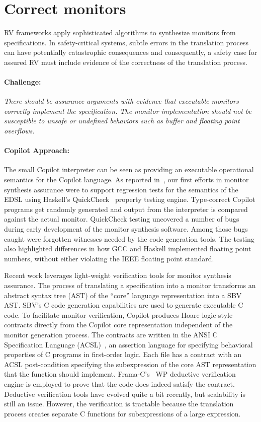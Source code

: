 \section{Correct monitors} \label{sec:codecorrect} 
 RV frameworks apply sophisticated algorithms to synthesize  monitors
 from specifications. In safety-critical systems, subtle errors in the
 translation process can have potentially catastrophic
 consequences and consequently, a safety case for assured RV must
 include  evidence of the correctness of the translation process.


\paragraph{Challenge:} \emph{There should be assurance arguments with
  evidence that
executable monitors correctly implement the specification.  The monitor implementation
should not be susceptible to unsafe or undefined behaviors such as
buffer and floating point overflows.}

\paragraph{Copilot Approach:}    
The  small  Copilot interpreter can be seen as providing an executable
operational semantics for the Copilot language.  As reported
in~\cite{pike-icfp-12}, our first efforts in monitor
synthesis assurance were  to support  regression tests for the semantics
of the EDSL using Haskell's QuickCheck~\cite{qc} property testing
engine. Type-correct Copilot programs get randomly generated and
output from the interpreter is compared against the actual
monitor. QuickCheck testing uncovered 
a number of bugs during early development of the monitor synthesis
software. Among those bugs caught were forgotten witnesses needed by
the code generation tools. The testing also highlighted 
differences in how GCC and Haskell implemented floating point numbers,
without either violating the IEEE floating point standard. 


Recent work  leverages light-weight verification tools for monitor
synthesis assurance.   The process of translating a specification into a monitor
transforms an abstract syntax tree (AST) of the ``core'' language representation into a SBV
AST.  SBV's C code generation capabilities are used to generate 
executable C code.  To facilitate monitor verification, Copilot 
produces Hoare-logic style contracts directly from the Copilot core
representation independent of the monitor generation process. The
contracts are written in the ANSI C Specification Language
(ACSL)~\cite{baudin09acsl}, an assertion language for specifying
behavioral properties of C programs in first-order logic.  Each file has a contract  with an ACSL 
post-condition  specifying the subexpression of the core
AST representation that the function should  implement. 
Frama-C's~\cite{framac} WP deductive verification engine is employed
to prove that the code does indeed satisfy the contract. Deductive
verification tools have evolved quite a bit recently, but scalability
is still an issue. However, the verification is tractable because the  translation process creates separate C
functions for subexpressions of a large expression. 


